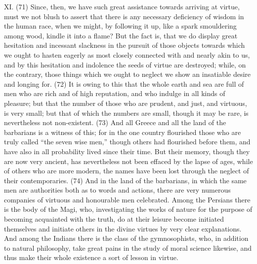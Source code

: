 XI. (71) Since, then, we have such great assistance towards arriving at virtue, must we not blush to
assert that there is any necessary deficiency of wisdom in the human race, when we might, by
following it up, like a spark smouldering among wood, kindle it into a flame? But the fact is, that we
do display great hesitation and incessant slackness in the pursuit of those objects towards which
we ought to hasten eagerly as most closely connected with and nearly akin to us, and by this
hesitation and indolence the seeds of virtue are destroyed; while, on the contrary, those things
which we ought to neglect we show an insatiable desire and longing for. (72) It is owing to this that
the whole earth and sea are full of men who are rich and of high reputation, and who indulge in all
kinds of pleasure; but that the number of those who are prudent, and just, and virtuous, is very
small; but that of which the numbers are small, though it may be rare, is nevertheless not
non-existent. (73) And all Greece and all the land of the barbarians is a witness of this; for in the
one country flourished those who are truly called ``the seven wise men,'' though others had
flourished before them, and have also in all probability lived since their time. But their memory,
though they are now very ancient, has nevertheless not been effaced by the lapse of ages, while of
others who are more modern, the names have been lost through the neglect of their
contemporaries. (74) And in the land of the barbarians, in which the same men are authorities both
as to words and actions, there are very numerous companies of virtuous and honourable men
celebrated. Among the Persians there is the body of the Magi, who, investigating the works of
nature for the purpose of becoming acquainted with the truth, do at their leisure become initiated
themselves and initiate others in the divine virtues by very clear explanations. And among the
Indians there is the class of the gymnosophists, who, in addition to natural philosophy, take great
pains in the study of moral science likewise, and thus make their whole existence a sort of lesson
in virtue.

